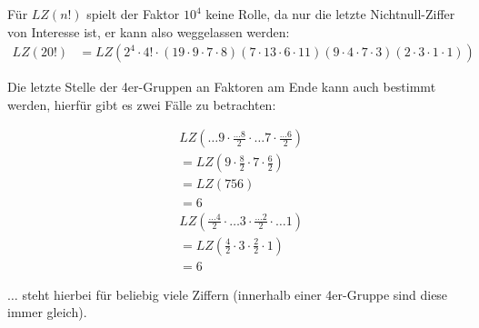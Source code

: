 \documentclass[12pt,a4paper,oneside]{article}
\newenvironment{Together}
{\vbox\bgroup}
{\egroup}
\begin{document}
Für $LZ(n!)$ spielt der Faktor $10^4$ keine Rolle, da nur die letzte Nichtnull-Ziffer von Interesse ist, er kann also weggelassen werden:
\begin{equation*}
	\begin{split}
		LZ(20!) &= LZ\left(2^4 \cdot 4! \cdot (19\cdot9\cdot7\cdot8)(7\cdot13\cdot6\cdot11)(9\cdot4\cdot7\cdot3)(2\cdot3\cdot1\cdot1)\right)
	\end{split}
\end{equation*}

\begin{Together}
Die letzte Stelle der 4er-Gruppen an Faktoren am Ende kann auch bestimmt werden, hierfür gibt es zwei Fälle zu betrachten:
\begin{multicols}{2}
	\noindent
	\begin{equation*}
		\begin{split}
			&LZ\left(\dots9 \cdot \frac{\dots8}{2} \cdot \dots7 \cdot \frac{\dots6}{2}\right) \\
			&= LZ\left(9\cdot\frac{8}{2}\cdot7\cdot\frac{6}{2}\right) \\
			&= LZ\left(756\right) \\
			&= 6
		\end{split}
	\end{equation*}
	\begin{equation*}
		\begin{split}
			&LZ\left(\frac{\dots4}{2} \cdot \dots3 \cdot \frac{\dots2}{2} \cdot \dots1\right) \\
			&= LZ\left(\frac{4}{2} \cdot 3 \cdot \frac{2}{2} \cdot 1\right) \\
			&= 6
		\end{split}
	\end{equation*}
\end{multicols}
$\dots$ steht hierbei für beliebig viele Ziffern (innerhalb einer 4er-Gruppe sind diese immer gleich). \\[10pt]
\end{Together}
\end{document}
